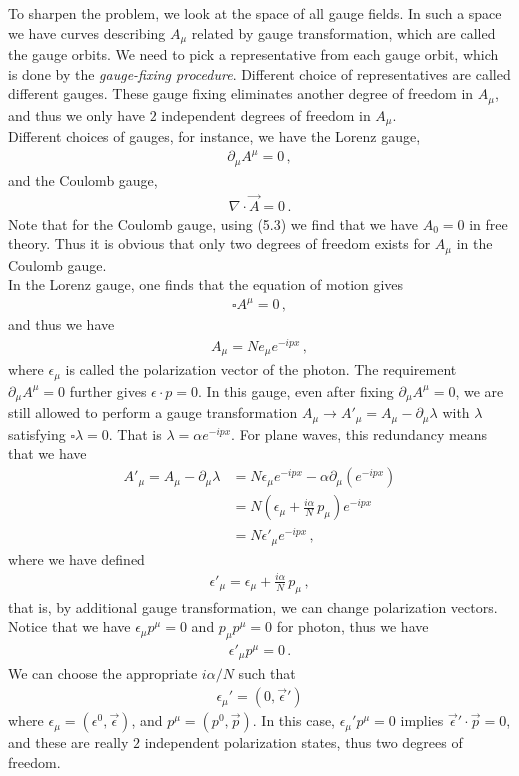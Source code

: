 \documentclass[11pt, onesided]{book}
\theoremstyle{break}
\theoremstyle{break}
\newcommand{\pd}{\partial}
\begin{document}
To sharpen the problem, we look at the space of all gauge fields. In such a space we have curves describing $A_\mu$ related by gauge transformation, which are called the gauge orbits. We need to pick a representative from each gauge orbit, which is done by the \textit{gauge-fixing procedure}. Different choice of representatives are called different gauges. These gauge fixing eliminates another degree of freedom in $A_\mu$, and thus we only have $2$ independent degrees of freedom in $A_\mu$. \\

Different choices of gauges, for instance, we have the Lorenz gauge,
\begin{align*}
\pd_\mu A^\mu = 0\,,
\end{align*}
and the Coulomb gauge,
\begin{align*}
\nabla \cdot \vec{A} = 0\,.
\end{align*}
Note that for the Coulomb gauge, using (5.3) we find that we have $A_0 = 0$ in free theory. Thus it is obvious that only two degrees of freedom exists for $A_\mu$ in the Coulomb gauge.\\

In the Lorenz gauge, one finds that the equation of motion gives
\begin{align*}
\square A^\mu = 0\,,
\end{align*}
and thus we have
\begin{align*}
A_\mu = N e_\mu e^{-ipx}\,,
\end{align*}
where $\epsilon_\mu$ is called the polarization vector of the photon. The requirement $\pd_\mu A^\mu = 0$ further gives $\epsilon \cdot p = 0$. In this gauge, even after fixing $\pd_\mu A^\mu = 0$, we are still allowed to perform a gauge transformation $A_\mu \to A'_\mu = A_\mu -\pd_\mu \lambda$ with $\lambda$ satisfying $\square \lambda = 0$. That is $\lambda =\alpha e^{-ipx}$. For plane waves, this redundancy means that we have
\begin{align*}
A'_\mu = A_\mu - \pd_\mu \lambda 
&= N \epsilon_\mu e^{-ipx} - \alpha \pd_\mu (e^{-ipx})\\
&=N \left( \epsilon_\mu + \frac{i\alpha}{N}\, p_\mu\right) e^{-ipx}\\
&= N \epsilon'_\mu e^{-ipx}\,,
\end{align*}
where we have defined
\begin{align*}
\epsilon'_\mu = \epsilon_\mu + \frac{i\alpha}{N}\, p_\mu\,,
\end{align*}
that is, by additional gauge transformation, we can change polarization vectors. Notice that we have $\epsilon_\mu p^\mu = 0$ and $p_\mu p^\mu = 0$ for photon, thus we have
\begin{align*}
\epsilon'_\mu p^\mu = 0\,.
\end{align*}
We can choose the appropriate $i\alpha /N$ such that 
\begin{align*}
\epsilon_\mu' = (0 , \vec{\epsilon}')
\end{align*}
where $\epsilon_\mu = (\epsilon^0, \vec{\epsilon})$, and $p^\mu = (p^0, \vec{p})$. In this case, $\epsilon_\mu' p^\mu = 0$ implies $\vec{\epsilon}'\cdot \vec{p} = 0$, and these are really $2$ independent polarization states, thus two degrees of freedom. 
\end{document}
